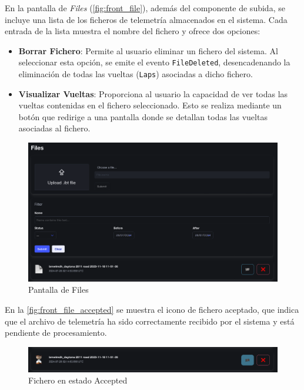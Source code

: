 En la pantalla de \textit{Files} (\autoref{fig:front_file}), además del componente de subida, se incluye una lista de los ficheros de telemetría almacenados en el sistema. Cada entrada de la lista muestra el nombre del fichero y ofrece dos opciones: 
\begin{itemize}
    \item \textbf{Borrar Fichero}: Permite al usuario eliminar un fichero del sistema. Al seleccionar esta opción, se emite el evento \texttt{FileDeleted}, desencadenando la eliminación de todas las vueltas (\texttt{Laps}) asociadas a dicho fichero.
    \item \textbf{Visualizar Vueltas}: Proporciona al usuario la capacidad de ver todas las vueltas contenidas en el fichero seleccionado. Esto se realiza mediante un botón que redirige a una pantalla donde se detallan todas las vueltas asociadas al fichero.
\end{itemize}

\begin{figure}[H]
\centering
\includegraphics[width=1\linewidth]{./figs/herramientas/desarrollo/front_file.png}
\caption[Pantalla de Files]{Pantalla de Files}
\label{fig:front_file}
\end{figure}

En la \autoref{fig:front_file_accepted} se muestra el icono de fichero aceptado, que indica que el archivo de telemetría ha sido correctamente recibido por el sistema y está pendiente de procesamiento.

\begin{figure}[H]
\centering
\includegraphics[width=1\linewidth]{./figs/herramientas/desarrollo/front_file_accepted.png}
\caption[Fichero en estado Accepted]{Fichero en estado Accepted}
\label{fig:front_file_accepted}
\end{figure}

